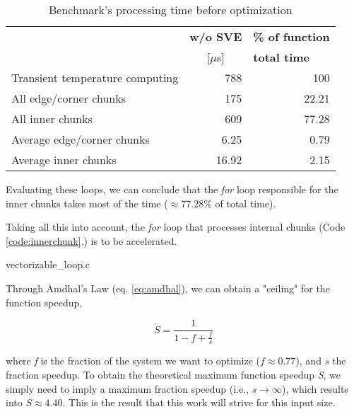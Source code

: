 \documentclass[conference]{IEEEtran}
\begin{document}
\begin{table}[htbp]
    \caption{Benchmark's processing time before optimization}
    \begin{center}
    \begin{tabular}{l r r}
    
    \multicolumn{1}{l}{} &
    \textbf{w/o SVE} &
    \multicolumn{1}{l}{\textbf{\% of function}}\\
    
    \multicolumn{1}{l}{} &
    \multicolumn{1}{c}{[\(\mu\)s]} &
    \multicolumn{1}{l}{\textbf{total time}}\\
    
    \hline
    Transient temperature computing & 788 & 100\\
    \hline
    All edge/corner chunks & 175 & 22.21\\
    \hline
    All inner chunks & 609 & 77.28\\
    \hline
    Average edge/corner chunks & 6.25 & 0.79\\
    \hline
    Average inner chunks & 16.92 & 2.15\\
    
    \hline 
    
    \end{tabular}
    \label{tab:profiling}
    \end{center}
\end{table}

Evaluating these loops, we can conclude that the \textit{for} loop responsible for the inner chunks takes most of the time ($\approx 77.28\%$ of total time).

Taking all this into account, the \textit{for} loop that processes internal chunks (Code \ref{code:innerchunk}.) is to be accelerated.


{vectorizable_loop.c}


Through Amdhal's Law (eq. \ref{eq:amdhal}), we can obtain a "ceiling" for the function speedup,

\begin{equation}\label{eq:amdhal}
    S = \frac{1}{1 - f + \frac{f}{s}}
\end{equation}

where \textit{f} is the fraction of the system we want to optimize (\(f\approx0.77\)), and \textit{s} the fraction speedup. To obtain the theoretical maximum function speedup \textit{S}, we simply need to imply a maximum fraction speedup (i.e., \(s\rightarrow\infty\)), which results into \(S\approx4.40\). This is the result that this work will strive for this input size.
\end{document}
